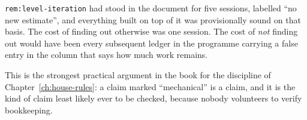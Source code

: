 \begin{obsv}
\label{obs:execute-the-sketch}
\texttt{rem:level-iteration} had stood in the document for five sessions,
labelled ``no new estimate'', and everything built on top of it was
provisionally sound on that basis. The cost of finding out otherwise was one
session. The cost of \emph{not} finding out would have been every subsequent
ledger in the programme carrying a false entry in the column that says how
much work remains.

\smallskip
This is the strongest practical argument in the book for the discipline of
Chapter~\ref{ch:house-rules}: a claim marked ``mechanical'' is a claim, and it
is the kind of claim least likely ever to be checked, because nobody
volunteers to verify bookkeeping.
\end{obsv}
